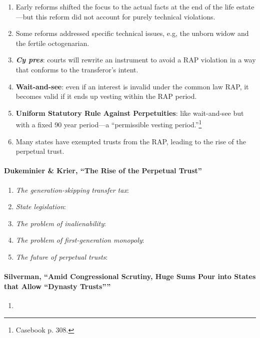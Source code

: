 \begin{enumerate}
    \item Early reforms shifted the focus to the actual facts at the end of 
    the life estate---but this reform did not account for purely technical 
    violations.
    \item Some reforms addressed specific technical issues, e.g, the unborn 
    widow and the fertile octogenarian.
    \item \textbf{\emph{Cy pres}}: courts will rewrite an instrument to avoid 
    a RAP violation in a way that conforms to the transferor's intent.
    \item \textbf{Wait-and-see}: even if an interest is invalid under the 
    common law RAP, it becomes valid if it ends up vesting within the RAP 
    period.
    \item \textbf{Uniform Statutory Rule Against Perpetuities}: like 
    wait-and-see but with a fixed 90 year period---a ``permissible vesting 
    period.''\footnote{Casebook p. 308.}
    \item Many states have exempted trusts from the RAP, leading to the rise 
    of the perpetual trust.
\end{enumerate}

\paragraph{Dukeminier \& Krier, ``The Rise of the Perpetual Trust''}

\begin{enumerate}
    \item \emph{The generation-skipping transfer tax}: 
    \item \emph{State legislation}:
    \item \emph{The problem of inalienability}:
    \item \emph{The problem of first-generation monopoly}:
    \item \emph{The future of perpetual trusts}: 
\end{enumerate}

\paragraph{Silverman, ``Amid Congressional Scrutiny, Huge Sums Pour into 
States that Allow \enquote{Dynasty Trusts}''}

\begin{enumerate}
    \item %
\end{enumerate}

